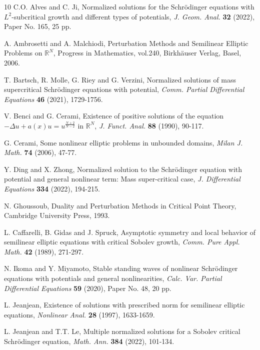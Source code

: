 \documentclass[10pt]{article}
\numberwithin{equation}{section}
\numberwithin{equation}{section}
\begin{document}
\begin{thebibliography}{10}
\begingroup
{}
 C.O. Alves and C. Ji, Normalized solutions for the Schr\"{o}dinger equations with $L^2$-subcritical growth and different types of potentials, {\it J. Geom. Anal.} {\bf 32} (2022), Paper No. 165, 25 pp.

 A. Ambrosetti and A. Malchiodi, Perturbation Methods and Semilinear Elliptic Problems on $\mathbb{R}^N$, Progress in Mathematics, vol.240, Birkh\"{a}user Verlag, Basel, 2006.

 T. Bartsch, R. Molle, G. Riey and G. Verzini, Normalized solutions of mass supercritical Schrödinger equations with potential, {\it Comm. Partial Differential Equations} {\bf 46}  (2021), 1729-1756.

 V. Benci and G. Cerami, Existence of positive solutions of the equation $-\Delta u+a(x)u=u^{\frac{N+2}{N-2}}$ in $\mathbb{R}^N$, {\it J. Funct. Anal.} {\bf 88} (1990), 90-117.

 G. Cerami, Some nonlinear elliptic problems in unbounded domains, {\it Milan J. Math.} {\bf 74} (2006), 47-77.


 Y. Ding and X. Zhong, Normalized solution to the Schr\"{o}dinger equation with potential and general nonlinear term: Mass super-critical case, {\it J. Differential Equations} {\bf 334} (2022), 194-215.

 N. Ghoussoub, Duality and Perturbation Methods in Critical Point Theory, Cambridge University Press, 1993.

 L. Caffarelli, B. Gidas and J. Spruck, Asymptotic symmetry and local behavior of semilinear elliptic equations with critical Sobolev growth, {\it Comm. Pure Appl. Math.} {\bf 42} (1989), 271-297.

 N. Ikoma and Y. Miyamoto, Stable standing waves of nonlinear Schr\"odinger equations with potentials and general nonlinearities,
{\it Calc. Var. Partial Differential Equations} {\bf 59} (2020), Paper No. 48, 20 pp.

 L. Jeanjean, Existence of solutions with prescribed norm for semilinear elliptic equations, {\it Nonlinear Anal.} {\bf 28} (1997), 1633-1659.


 L. Jeanjean and T.T. Le,
Multiple normalized solutions for a Sobolev critical Schrödinger equation,
{\it Math. Ann.} {\bf 384} (2022), 101-134.


\end{thebibliography}
\end{document}
